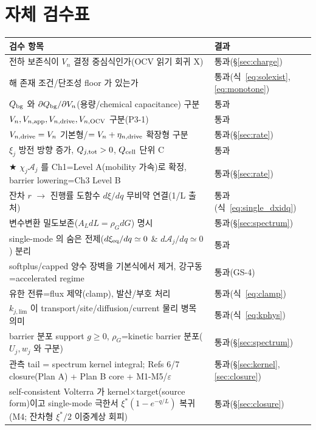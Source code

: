 \section{자체 검수표}\label{sec:selfcheck}
\begin{longtable}{p{} p{}}
\toprule 검수 항목 & 결과 \\ \midrule \endhead
전하 보존식이 $V_n$ 결정 중심식인가(OCV 읽기 회귀 X) & 통과(\S\ref{sec:charge}) \\
해 존재 조건/단조성 floor 가 있는가 & 통과(식~\eqref{eq:solexist},\eqref{eq:monotone}) \\
$Q_{\mathrm{bg}}$ 와 $\partial Q_{\mathrm{bg}}/\partial V_n$(용량/chemical capacitance) 구분 & 통과 \\
$V_n,V_{n,\mathrm{app}},V_{n,\mathrm{drive}},V_{n,\mathrm{OCV}}$ 구분(P3-1) & 통과 \\
$V_{n,\mathrm{drive}}=V_n$ 기본형/$=V_n+\eta_{n,\mathrm{drive}}$ 확장형 구분 & 통과(\S\ref{sec:rate}) \\
$\xi_j$ 방전 방향 증가, $Q_{j,\mathrm{tot}}>0$, $Q_{\mathrm{cell}}$ 단위 C & 통과 \\
★ $\chi_j\mathcal A_j$ 를 Ch1=Level A(mobility 가속)로 확정, barrier lowering=Ch3 Level B & 통과(\S\ref{sec:rate}) \\
잔차 $r$ $\to$ 진행률 도함수 $d\xi/dq$ 무비약 연결(1/L 출처) & 통과(식~\eqref{eq:single_dxidq}) \\
변수변환 밀도보존($A_L dL=\rho_G dG$) 명시 & 통과(\S\ref{sec:spectrum}) \\
single-mode 의 숨은 전제($d\xi_{\mathrm{eq}}/dq\simeq0$ \& $d\mathcal A_j/dq\simeq0$) 분리 & 통과 \\
softplus/capped 양수 장벽을 기본식에서 제거, 강구동=accelerated regime & 통과(GS-4) \\
유한 전류=flux 제약(clamp), 발산/부호 처리 & 통과(식~\eqref{eq:clamp}) \\
$k_{j,\mathrm{lim}}$ 이 transport/site/diffusion/current 물리 병목 의미 & 통과(식~\eqref{eq:kphys}) \\
barrier 분포 support $g\ge0$, $\rho_G$=kinetic barrier 분포($U_j,w_j$ 와 구분) & 통과(\S\ref{sec:spectrum}) \\
관측 tail = spectrum kernel integral; Refs 6/7 closure(Plan A) + Plan B core + M1-M5/$\varepsilon$ & 통과(\S\ref{sec:kernel},\ref{sec:closure}) \\
self-consistent Volterra 가 kernel$\times$target(source form)이고 single-mode 극한서 $\xi^\ast(1-e^{-q/L})$ 복귀(M4; 잔차형 $\xi^\ast/2$ 이중계상 회피) & 통과(\S\ref{sec:closure}) \\

\end{longtable}
